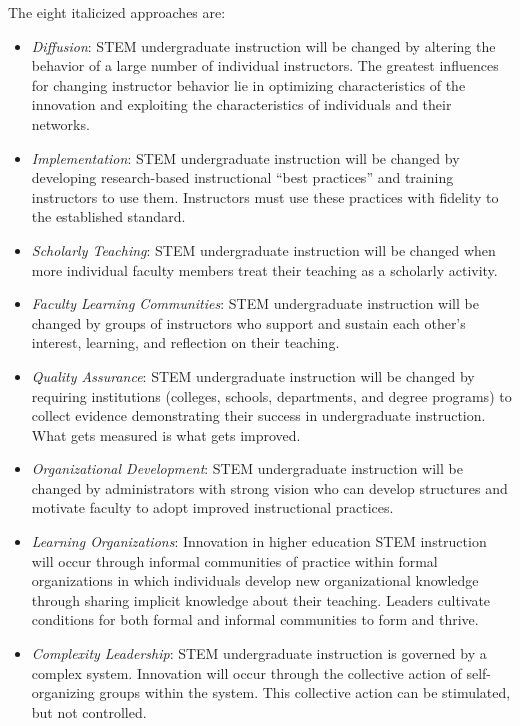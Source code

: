 The eight italicized approaches are:

\begin{itemize}
\itemsep1pt\parskip0pt
\item
  \emph{Diffusion}: STEM undergraduate instruction will be changed by
  altering the behavior of a large number of individual instructors. The
  greatest influences for changing instructor behavior lie in optimizing
  characteristics of the innovation and exploiting the characteristics
  of individuals and their networks.
\item
  \emph{Implementation}: STEM undergraduate instruction will be changed
  by developing research-based instructional ``best practices'' and
  training instructors to use them. Instructors must use these practices
  with fidelity to the established standard.
\item
  \emph{Scholarly Teaching}: STEM undergraduate instruction will be
  changed when more individual faculty members treat their teaching as a
  scholarly activity.
\item
  \emph{Faculty Learning Communities}: STEM undergraduate instruction
  will be changed by groups of instructors who support and sustain each
  other's interest, learning, and reflection on their teaching.
\item
  \emph{Quality Assurance}: STEM undergraduate instruction will be
  changed by requiring institutions (colleges, schools, departments, and
  degree programs) to collect evidence demonstrating their success in
  undergraduate instruction. What gets measured is what gets improved.
\item
  \emph{Organizational Development}: STEM undergraduate instruction will
  be changed by administrators with strong vision who can develop
  structures and motivate faculty to adopt improved instructional
  practices.
\item
  \emph{Learning Organizations}: Innovation in higher education STEM
  instruction will occur through informal communities of practice within
  formal organizations in which individuals develop new organizational
  knowledge through sharing implicit knowledge about their teaching.
  Leaders cultivate conditions for both formal and informal communities
  to form and thrive.
\item
  \emph{Complexity Leadership}: STEM undergraduate instruction is
  governed by a complex system. Innovation will occur through the
  collective action of self-organizing groups within the system. This
  collective action can be stimulated, but not controlled.
\end{itemize}

